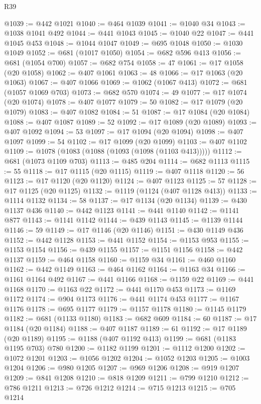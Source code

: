 \begin{lexlean}{R39}
\begin{coremodule}
@1039 := @442 @1021
@1040 := @464 @1039
@1041 := @1040 @34
@1043 := @1038 @1041 @492
@1044 := @441 @1043
@1045 := @1040 @22
@1047 := @441 @1045 @453
@1048 := @1044 @1047
@1049 := @695 @1048
@1050 := @1030 @1049
@1052 := @681 (@1017 @1050)
@1054 := @682 @596 @413
@1056 := @681 (@1054 @700)
@1057 := @682 @754
@1058 := 47
@1061 := @17 @1058 (@20 @1058)
@1062 := @407 @1061
@1063 := 48
@1066 := @17 @1063 (@20 @1063)
@1067 := @407 @1066
@1069 := @1062 (@1067 @413)
@1072 := @681 (@1057 @1069 @703)
@1073 := @682 @570
@1074 := 49
@1077 := @17 @1074 (@20 @1074)
@1078 := @407 @1077
@1079 := 50
@1082 := @17 @1079 (@20 @1079)
@1083 := @407 @1082
@1084 := 51
@1087 := @17 @1084 (@20 @1084)
@1088 := @407 @1087
@1089 := 52
@1092 := @17 @1089 (@20 @1089)
@1093 := @407 @1092
@1094 := 53
@1097 := @17 @1094 (@20 @1094)
@1098 := @407 @1097
@1099 := 54
@1102 := @17 @1099 (@20 @1099)
@1103 := @407 @1102
@1109 := @1078 (@1083 (@1088 (@1093 (@1098 (@1103 @413)))))
@1112 := @681 (@1073 @1109 @703)
@1113 := @485 @204
@1114 := @682 @1113
@1115 := 55
@1118 := @17 @1115 (@20 @1115)
@1119 := @407 @1118
@1120 := 56
@1123 := @17 @1120 (@20 @1120)
@1124 := @407 @1123
@1125 := 57
@1128 := @17 @1125 (@20 @1125)
@1132 := @1119 (@1124 (@407 @1128 @413))
@1133 := @1114 @1132
@1134 := 58
@1137 := @17 @1134 (@20 @1134)
@1139 := @430 @1137 @436
@1140 := @442 @1123
@1141 := @441 @1140
@1142 := @1141 @877
@1143 := @1141 @1142
@1144 := @439 @1143
@1145 := @1139 @1144
@1146 := 59
@1149 := @17 @1146 (@20 @1146)
@1151 := @430 @1149 @436
@1152 := @442 @1128
@1153 := @441 @1152
@1154 := @1153 @953
@1155 := @1153 @1154
@1156 := @439 @1155
@1157 := @1151 @1156
@1158 := @442 @1137
@1159 := @464 @1158
@1160 := @1159 @34
@1161 := @460 @1160
@1162 := @442 @1149
@1163 := @464 @1162
@1164 := @1163 @34
@1166 := @1161 @1164 @492
@1167 := @441 @1166
@1168 := @1159 @22
@1169 := @441 @1168
@1170 := @1163 @22
@1172 := @441 @1170 @453
@1173 := @1169 @1172
@1174 := @904 @1173
@1176 := @441 @1174 @453
@1177 := @1167 @1176
@1178 := @695 @1177
@1179 := @1157 @1178
@1180 := @1145 @1179
@1182 := @681 (@1133 @1180)
@1183 := @682 @609
@1184 := 60
@1187 := @17 @1184 (@20 @1184)
@1188 := @407 @1187
@1189 := 61
@1192 := @17 @1189 (@20 @1189)
@1195 := @1188 (@407 @1192 @413)
@1199 := @681 (@1183 @1195 @703) @780
@1200 := @1182 @1199
@1201 := @1112 @1200
@1202 := @1072 @1201
@1203 := @1056 @1202
@1204 := @1052 @1203
@1205 := @1003 @1204
@1206 := @980 @1205
@1207 := @969 @1206
@1208 := @919 @1207
@1209 := @841 @1208
@1210 := @818 @1209
@1211 := @799 @1210
@1212 := @786 @1211
@1213 := @726 @1212
@1214 := @715 @1213
@1215 := @705 @1214

\end{coremodule}
\end{lexlean}
